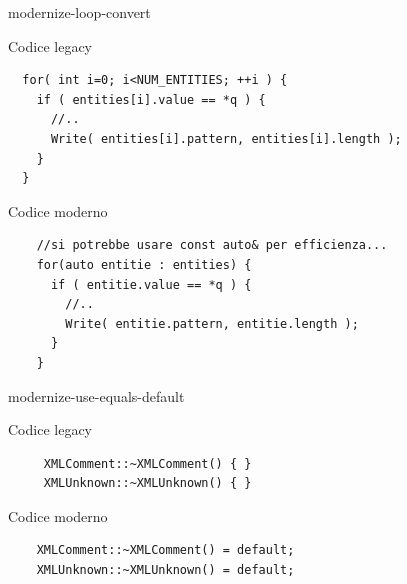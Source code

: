 \documentclass[aspectratio=169]{beamer}
\begin{document}


\begin{frame}[fragile]{modernize-loop-convert}
  \vspace{-1em}
  \begin{block}{Codice legacy}
  \begin{lstlisting}
  for( int i=0; i<NUM_ENTITIES; ++i ) {
    if ( entities[i].value == *q ) {
      //.. 
      Write( entities[i].pattern, entities[i].length );      
    } 
  }
  \end{lstlisting}
 \end{block}

 \begin{block}{Codice moderno}
    \begin{lstlisting}
    //si potrebbe usare const auto& per efficienza...
    for(auto entitie : entities) {
      if ( entitie.value == *q ) {
        //.. 
        Write( entitie.pattern, entitie.length );               
      } 
    }
    \end{lstlisting}
  \end{block}

\end{frame}


%
\begin{frame}[fragile]{modernize-use-equals-default}
  \vspace{-1em}
  \begin{block}{Codice legacy}
  \begin{lstlisting}
     XMLComment::~XMLComment() { }
     XMLUnknown::~XMLUnknown() { }
  \end{lstlisting}
 \end{block}

 \begin{block}{Codice moderno}
    \begin{lstlisting}
    XMLComment::~XMLComment() = default;
    XMLUnknown::~XMLUnknown() = default;
    \end{lstlisting}
  \end{block}

\end{frame}


\end{document}

